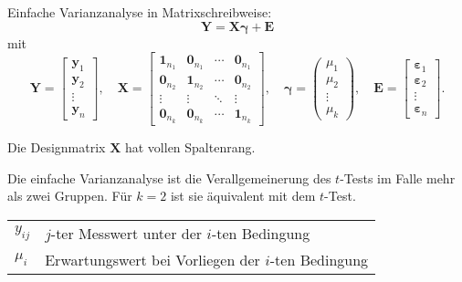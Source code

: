 \begin{defi}[Varianzanalyse]{Einfache Varianzanalyse}
    in Matrixschreibweise:
    \[
        \mathbf{Y} = \mathbf{X} \boldsymbol{\gamma} + \mathbf{E}
    \]
    mit
    \[
        \mathbf{Y} = \begin{bmatrix}
            \mathbf{y}_1 \\ \mathbf{y}_2 \\ \vdots \\ \mathbf{y}_n
        \end{bmatrix},
        \quad \mathbf{X} = \begin{bmatrix}
            \mathbf{1}_{n_1} & \mathbf{0}_{n_1} & \cdots & \mathbf{0}_{n_1} \\
            \mathbf{0}_{n_2} & \mathbf{1}_{n_2} & \cdots & \mathbf{0}_{n_2} \\
            \vdots           & \vdots           & \ddots & \vdots           \\
            \mathbf{0}_{n_k} & \mathbf{0}_{n_k} & \cdots & \mathbf{1}_{n_k}
        \end{bmatrix},
        \quad \boldsymbol{\gamma} = \begin{pmatrix}
            \mu_1 \\ \mu_2 \\ \vdots \\ \mu_k
        \end{pmatrix},
        \quad \mathbf{E} = \begin{bmatrix}
            \boldsymbol{\varepsilon}_1 \\ \boldsymbol{\varepsilon}_2 \\ \vdots \\ \boldsymbol{\varepsilon}_n
        \end{bmatrix}.
    \]


    Die Designmatrix $\mathbf{X}$ hat vollen Spaltenrang.

    Die einfache Varianzanalyse ist die Verallgemeinerung des $t$-Tests im Falle mehr als zwei Gruppen.
    Für $k = 2$ ist sie äquivalent mit dem $t$-Test.

    \tcbline

    \begin{tabularx}{\linewidth}{lX}
        $y_{ij}$ & $j$-ter Messwert unter der $i$-ten Bedingung       \\
        $\mu_i$  & Erwartungswert bei Vorliegen der $i$-ten Bedingung
    \end{tabularx}
\end{defi}

